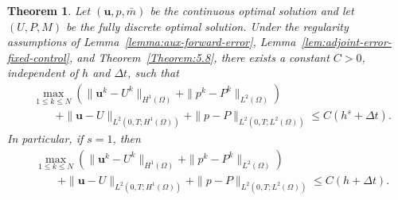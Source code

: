 \documentclass{amsart}
\newtheorem{theorem}{Theorem}[section]
\begin{document}
\begin{theorem}\label{Theorem:5.9}
Let $(\boldsymbol u,p,\bar m)$ be the continuous optimal solution and
let $(U,P,M)$ be the fully discrete optimal solution. Under the
regularity assumptions of Lemma~\ref{lemma:aux-forward-error},
Lemma~\ref{lem:adjoint-error-fixed-control}, and
Theorem~\ref{Theorem:5.8}, there exists a constant $C>0$, independent of
$h$ and $\Delta t$, such that
\[
\begin{aligned}
&\max_{1\le k\le N}
\left(
\|\boldsymbol u^k-U^k\|_{H^1(\Omega)}
+
\|p^k-P^k\|_{L^2(\Omega)}
\right)
\\
&\qquad
+
\|\boldsymbol u-U\|_{L^2(0,T;H^1(\Omega))}
+
\|p-P\|_{L^2(0,T;L^2(\Omega))}
\le
C(h^s+\Delta t).
\end{aligned}
\]
In particular, if $s=1$, then
\[
\begin{aligned}
&\max_{1\le k\le N}
\left(
\|\boldsymbol u^k-U^k\|_{H^1(\Omega)}
+
\|p^k-P^k\|_{L^2(\Omega)}
\right)
\\
&\qquad
+
\|\boldsymbol u-U\|_{L^2(0,T;H^1(\Omega))}
+
\|p-P\|_{L^2(0,T;L^2(\Omega))}
\le
C(h+\Delta t).
\end{aligned}
\]
\end{theorem}
\end{document}
